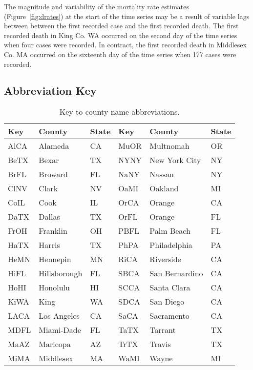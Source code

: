 \documentclass[12pt,letterpaper]{article}
\begin{document}
The magnitude and variability of the mortality rate estimates
(Figure~\ref{fig:drates})
at the start of the time series may be a result of variable lags
between between the first recorded case and the first recorded death.
The first recorded death in King Co. WA occurred on the second day of
the time series when four cases were recorded.
In contract, the first recorded death in Middlesex Co. MA occurred on
the sixteenth day of the time series when 177 cases were recorded.



\clearpage
\printbibliography[title=References]
\clearpage

\appendixpage
\begin{appendices}


\section{Abbreviation Key}

\begin{table}[h!]
\caption{\label{tab:namekey}
Key to county name abbreviations.
}
\centering
\begin{tabular}{lll||lll}
\hline
Key&County&State&Key&County&State\\
\hline
AlCA&Alameda&CA&MuOR&Multnomah&OR\\
BeTX&Bexar&TX&NYNY&New York City&NY\\
BrFL&Broward&FL&NaNY&Nassau&NY\\
ClNV&Clark&NV&OaMI&Oakland&MI\\
CoIL&Cook&IL&OrCA&Orange&CA\\
DaTX&Dallas&TX&OrFL&Orange&FL\\
FrOH&Franklin&OH&PBFL&Palm Beach&FL\\
HaTX&Harris&TX&PhPA&Philadelphia&PA\\
HeMN&Hennepin&MN&RiCA&Riverside&CA\\
HiFL&Hillsborough&FL&SBCA&San Bernardino&CA\\
HoHI&Honolulu&HI&SCCA&Santa Clara&CA\\
KiWA&King&WA&SDCA&San Diego&CA\\
LACA&Los Angeles&CA&SaCA&Sacramento&CA\\
MDFL&Miami-Dade&FL&TaTX&Tarrant&TX\\
MaAZ&Maricopa&AZ&TrTX&Travis&TX\\
MiMA&Middlesex&MA&WaMI&Wayne&MI\\
\hline
\end{tabular}


\end{table}
\end{appendices}
\end{document}
